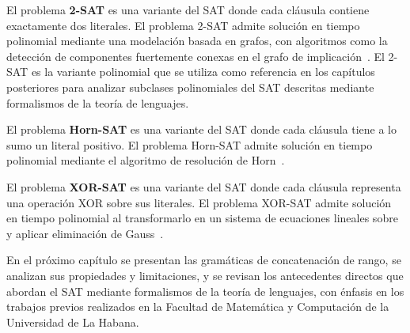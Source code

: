 \documentclass{report}
\theoremstyle{definition}
\theoremstyle{plain}
\theoremstyle{remark}
\begin{document}
El problema \textbf{2-SAT} es una variante del SAT donde cada cláusula
contiene exactamente dos literales. El problema 2-SAT admite solución en
tiempo polinomial mediante una modelación basada en grafos, con
algoritmos como la detección de componentes fuertemente conexas en el
grafo de implicación~\cite{halim2013cp3}. El 2-SAT es la variante
polinomial que se utiliza como referencia en los capítulos posteriores
para analizar subclases polinomiales del SAT descritas mediante
formalismos de la teoría de lenguajes.

El problema \textbf{Horn-SAT} es una variante del SAT donde cada
cláusula tiene a lo sumo un literal positivo. El problema Horn-SAT
admite solución en tiempo polinomial mediante el algoritmo de resolución
de Horn~\cite{dowling1984horn}. 

El problema \textbf{XOR-SAT} es una variante del SAT donde cada cláusula representa una operación XOR sobre sus literales. El problema XOR-SAT admite solución en tiempo polinomial al transformarlo en un sistema de ecuaciones lineales sobre  y aplicar eliminación de Gauss~\cite{han2012xorsat}.


En el próximo capítulo se presentan las gramáticas de concatenación de rango, se analizan sus propiedades y limitaciones, y se revisan los antecedentes directos que abordan el SAT mediante formalismos de la teoría de lenguajes, con énfasis en los trabajos previos realizados en la Facultad de Matemática y Computación de la Universidad de La Habana.



\end{document}
